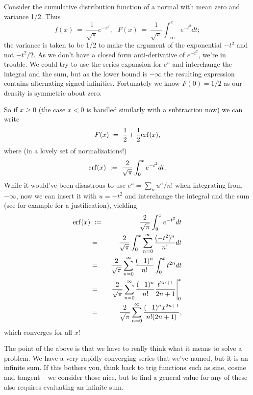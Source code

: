 \documentclass[12pt,reqno]{amsart}
\newcommand{\erf}{{\rm erf}}
\theoremstyle{plain}
\numberwithin{equation}{section} %
\numberwithin{table}{section} %
\numberwithin{figure}{section}
\begin{document}
Consider the cumulative distribution function of a normal with mean zero and variance 1/2. Thus $$f(x) \ = \ \frac1{\sqrt{\pi}} e^{-x^2}, \ \ \ F(x) \ = \ \frac1{\sqrt{\pi}} \int_{-\infty}^x e^{-t^2} dt;$$ the variance is taken to be 1/2 to make the argument of the exponential $-t^2$ and not $-t^2/2$. As we don't have a closed form anti-derivative of $e^{-t^2}$, we're in trouble. We could try to use the series expansion for $e^u$ and interchange the integral and the sum, but as the lower bound is $-\infty$ the resulting expression contains alternating signed infinities. Fortunately we know $F(0) = 1/2$ as our density is symmetric about zero.

So if $x \ge 0$ (the case $x < 0$ is handled similarly with a subtraction now) we can write $$F(x) \ = \ \frac12 + \frac12\erf(x),$$ where (in a lovely set of normalizations!) $$\erf(x)\ := \ \frac{2}{\sqrt{\pi}}\int_0^x e^{-t^2}dt.$$ While it would've been disastrous to use $e^u = \sum_n u^n/n!$ when integrating from $-\infty$, now we can insert it with $u = -t^2$ and interchange the integral and the sum (see for example \cite{La} for a justification), yielding
\begin{eqnarray}
   \erf(x) &\ := \ &  \frac{2}{\sqrt{\pi}}\int_0^x e^{-t^2} dt \nonumber\\ &=& \frac{2}{\sqrt{\pi}}\int_0^x \sum_{n=0}^\infty \frac{(-t^2)^n}{n!} dt \nonumber\\  &=& \frac{2}{\sqrt{\pi}} \sum_{n=0}^\infty \frac{(-1)^n}{n!} \int_0^x t^{2n} dt \nonumber\\ &=&   \frac{2}{\sqrt{\pi}}\sum_{n=0}^\infty \frac{(-1)^n}{n!} \frac{t^{2n+1}}{2n+1}\Bigg|_0^x \nonumber\\ &=&  \frac{2}{\sqrt{\pi}}\sum_{n=0}^\infty \frac{(-1)^n x^{2n+1}}{n! (2n+1)}, \nonumber
\end{eqnarray} which converges for all $x$!

The point of the above is that we have to really think what it means to solve a problem. We have a very rapidly converging series that we've named, but it is an infinite sum. If this bothers you, think back to trig functions such as sine, cosine and tangent -- we consider those nice, but to find a general value for any of these also requires evaluating an infinite sum.
\end{document}
